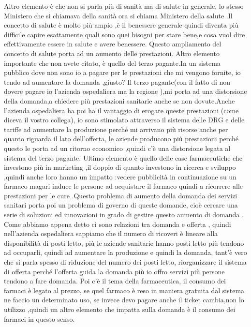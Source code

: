 Altro elemento è che non si parla più di sanità ma di salute in
generale, lo stesso Ministero che si chiamava della sanità ora si chiama
Ministero della salute .Il concetto di salute è molto più ampio ,è il
benessere generale quindi diventa più difficile capire esattamente quali
sono quei bisogni per stare bene,e cosa vuol dire effettivamente essere
in salute e avere benessere. Questo ampliamento del concetto di salute
porta ad un aumento delle prestazioni. Altro elemento importante che non
avete citato, è quello del terzo pagante.In un sistema pubblico dove non
sono io a pagare per le prestazioni che mi vengono fornite, io tendo ad
aumentare la domanda ,giusto? Il terzo pagante(con il fatto di non
dovere pagare io l'azienda ospedaliera ma la regione ),mi porta ad una
distorsione della domanda,a chiedere più prestazioni sanitarie anche se
non dovute.Anche l'azienda ospedaliera ha poi ha il vantaggio di erogare
queste prestazioni (come diceva il vostro collega), io sono stimolato
attraverso il sistema delle DRG e delle tariffe ad aumentare la
produzione perché mi arrivano più risorse anche per quanto riguarda il
lato dell'offerta, le aziende producono più prestazioni perché questo le
porta ad un ritorno economico ,quindi c'è una distorsione legata al
sistema del terzo pagante. Ultimo elemento è quello delle case
farmaceutiche che investono più in marketing ,il doppio di quanto
investono in ricerca e sviluppo ,quindi anche loro hanno un impatto
:vedere pubblicità in continuazione su un farmaco magari induce le
persone ad acquistare il farmaco quindi a ricorrere alle prestazioni per
le cure .Questo problema di aumento della domanda dei servizi sanitari
porta poi un problema di governo di queste domande, cioè cercare una
serie di soluzioni ed innovazioni in grado di gestire questo aumento di
domanda . Come abbiamo appena detto ci sono relazioni tra domanda e
offerta , quindi nell'azienda ospedaliera sappiamo che il numero di
ricoveri è lineare alla disponibilità di posti letto, più le aziende
sanitarie hanno posti letto più tendono ad occuparli, quindi ad
aumentare la produzione e quindi la domanda, tant'è vero che si parla
spesso di riduzione del numero dei posti letto, riorganizzare il sistema
di offerta perché l'offerta guida la domanda più io offro servizi più
persone tendono a fare domanda. Poi c'è il tema della farmaceutica, il
consumo dei farmaci è legato al prezzo, se quel farmaco è reso in
maniera gratuita dal sistema ne faccio un determinato uso, se invece
devo pagare anche il ticket cambia,non lo utilizzo ,quindi un altro
elemento che impatta sulla domanda è il consumo dei farmaci in questo
senso.

